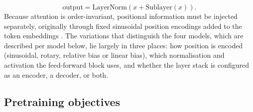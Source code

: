 \begin{equation}
\label{eq:resnorm}
\mathrm{output} = \mathrm{LayerNorm}\!\left(x + \mathrm{Sublayer}(x)\right).
\end{equation}
Because attention is order-invariant, positional information must be injected separately, originally through fixed sinusoidal position encodings added to the token embeddings \cite{vaswani2017attention}. The variations that distinguish the four models, which are described per model below, lie largely in three places: how position is encoded (sinusoidal, rotary, relative bias or linear bias), which normalisation and activation the feed-forward block uses, and whether the layer stack is configured as an encoder, a decoder, or both.

\subsection{Pretraining objectives}
\label{sec:pretraining-objectives}

